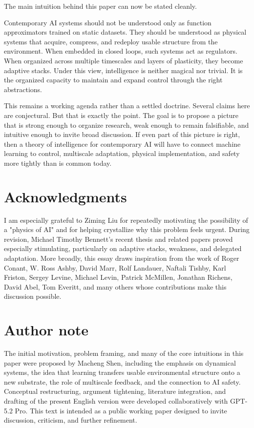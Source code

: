 \documentclass[11pt]{article}
\begin{document}
The main intuition behind this paper can now be stated cleanly.

Contemporary AI systems should not be understood only as function approximators trained on static datasets. They should be understood as physical systems that acquire, compress, and redeploy usable structure from the environment. When embedded in closed loops, such systems act as regulators. When organized across multiple timescales and layers of plasticity, they become adaptive stacks. Under this view, intelligence is neither magical nor trivial. It is the organized capacity to maintain and expand control through the right abstractions.

This remains a working agenda rather than a settled doctrine. Several claims here are conjectural. But that is exactly the point. The goal is to propose a picture that is strong enough to organize research, weak enough to remain falsifiable, and intuitive enough to invite broad discussion. If even part of this picture is right, then a theory of intelligence for contemporary AI will have to connect machine learning to control, multiscale adaptation, physical implementation, and safety more tightly than is common today.

\section{Acknowledgments}


I am especially grateful to Ziming Liu for repeatedly motivating the possibility of a "physics of AI" and for helping crystallize why this problem feels urgent. During revision, Michael Timothy Bennett's recent thesis and related papers proved especially stimulating, particularly on adaptive stacks, weakness, and delegated adaptation. More broadly, this essay draws inspiration from the work of Roger Conant, W. Ross Ashby, David Marr, Rolf Landauer, Naftali Tishby, Karl Friston, Sergey Levine, Michael Levin, Patrick McMillen, Jonathan Richens, David Abel, Tom Everitt, and many others whose contributions make this discussion possible.

\section{Author note}


The initial motivation, problem framing, and many of the core intuitions in this paper were proposed by Macheng Shen, including the emphasis on dynamical systems, the idea that learning transfers usable environmental structure onto a new substrate, the role of multiscale feedback, and the connection to AI safety. Conceptual restructuring, argument tightening, literature integration, and drafting of the present English version were developed collaboratively with GPT-5.2 Pro. This text is intended as a public working paper designed to invite discussion, criticism, and further refinement.
\end{document}
